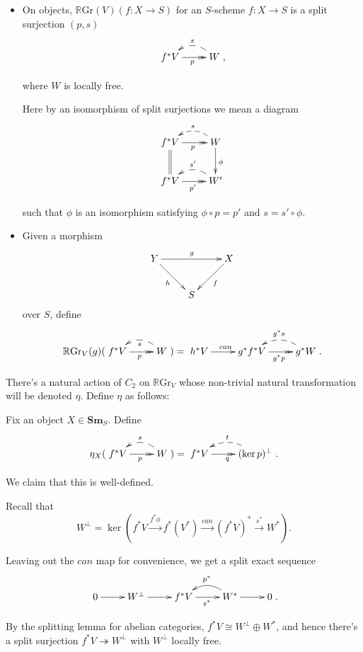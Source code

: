 \documentclass[edeposit,fullpage]{uiucthesis2009}
\newcommand{\RGr}{\mathbb R\mathrm{Gr}}
\newcommand{\Sm}[1]{\mathbf{Sm}_{#1}}
\theoremstyle{plain}
\numberwithin{lemma}{section}
\theoremstyle{definition}
\begin{document}
\begin{itemize}
\item On objects, $\RGr(V)(f: X \rightarrow S)$ for an $S$-scheme $f :
  X \rightarrow S$ is a split surjection $(p,s)$
\[
\xymatrix{f^*V \ar@{>>}[r]_p & \ar@/_1.0pc/@{-->}[l]_sW},
\]

where $W$ is locally free. 

Here by an isomorphism of split surjections we mean a diagram
\[
\xymatrix{f^*V \ar@{>>}[r]_p \ar@{=}[d]& \ar@/_1.0pc/@{-->}[l]_sW \ar[d]^\phi\\
f^*V \ar@{>>}[r]_{p'} & \ar@/_1.0pc/@{-->}[l]_{s'}W'}
\]

such that $\phi$ is an isomorphism satisfying $\phi \circ p = p'$ and $s = s'\circ \phi$.

\item Given a morphism 
\[
\xymatrix{Y\ar[dr]_h \ar[rr]^g &&X\ar[dl]^f\\& S&}
\]
over $S$, define
\[
\RGr_V(g)(\xymatrix{f^*V \ar@{>>}[r]_p & \ar@/_1.0pc/@{-->}[l]^sW}) = 
\xymatrix{h^*V \ar[r]^{can} & g^*f^*V \ar@{>>}[r]_{g^*p} &
  \ar@/_1.0pc/@{-->}[l]_{g^*s} g^*W}.
\]
\end{itemize}
There's a natural action of $C_2$ on $\RGr_V$ whose non-trivial
natural transformation will be denoted $\eta$. Define $\eta$ as
follows: 

 Fix an object $X \in \Sm{S}$. Define
\[
\eta_X(\xymatrix{f^*V \ar@{>>}[r]_p & \ar@/_1.0pc/@{-->}[l]_sW}) =
\xymatrix{f^*V \ar@{>>}[r]_q & \ar@/_1.0pc/@{-->}[l]_t(\ker p)^\perp}.
\]

We claim that this is well-defined. %

Recall that 
\[
W^\perp = \ker(f^*V \xrightarrow{f^*\phi} f^*(V^*) \xrightarrow{can}
(f^*V)^* \xrightarrow{s^*} W^*).
\]



Leaving out the $can$ map for convenience, we get a split exact sequence 
\[
\xymatrix{0 \ar[r] & W^\perp \ar[r] & f^*V \ar[r]_{s^*}& \ar@/_1.0pc/[l]_{p^*} W^*
\ar[r] & 0}.
\]

By the splitting lemma for abelian categories, $f^*V \cong W^\perp
\oplus W^*$, and hence there's a split surjection $f^*V
\twoheadrightarrow W^\perp$ with $W^\perp$ locally free. 
\end{document}
